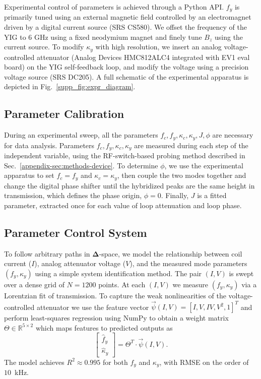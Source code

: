 \documentclass[%
  reprint,
  amsmath,amssymb,
  aps,
  prapplied,
  superscriptaddress,
  longbibliography]{revtex4-2}
\begin{document}
Experimental control of parameters is achieved through a Python API. $f_y$ is primarily tuned using an external magnetic field controlled by an electromagnet driven by a digital current source (SRS CS580). We offset the frequency of the YIG to 6 GHz using a fixed neodymium magnet and finely tune $B_z$ using the current source. To modify $\kappa_y$ with high resolution, we insert an analog voltage-controlled attenuator (Analog Devices HMC812ALC4 integrated with EV1 eval board) on the YIG self-feedback loop, and modify the voltage using a precision voltage source (SRS DC205). A full schematic of the experimental apparatus is depicted in Fig.~\ref{supp_fig:expr_diagram}.

\subsection{\label{appendix-sec:methods-calibration} Parameter Calibration}

During an experimental sweep, all the parameters $f_c, f_y, \kappa_c, \kappa_y, J, \phi$ are necessary for data analysis. Parameters $f_c, f_y, \kappa_c, \kappa_y$ are measured during each step of the independent variable, using the RF-switch-based probing method described in Sec.~\ref{appendix-sec:methods-device}. To determine $\phi$, we use the experimental apparatus to set $f_c = f_y$ and $\kappa_c = \kappa_y$, then couple the two modes together and change the digital phase shifter until the hybridized peaks are the same height in transmission, which defines the phase origin, $\phi = 0$. Finally, $J$ is a fitted parameter, extracted once for each value of loop attenuation and loop phase.

\subsection{\label{appendix-sec:methods-control} Parameter Control System}

To follow arbitrary paths in $\boldsymbol{\Delta}$-space, we model the relationship between coil current ($I$), analog attenuator voltage ($V$), and the measured mode parameters $(f_y, \kappa_y)$ using a simple system identification method. The pair $(I, V)$ is swept over a dense grid of $N = 1200$ points. At each $(I, V)$ we measure $(f_y, \kappa_y)$ via a Lorentzian fit of transmission. To capture the weak nonlinearities of the voltage-controlled attenuator we use the feature vector $\vec{\psi}(I, V) = [I, V, IV, V^2, 1]^T$ and perform least-squares regression using NumPy to obtain a weight matrix $\Theta \in \mathbb{R}^{5\times 2}$ which maps features to predicted outputs as
\begin{equation}
\begin{bmatrix}
\hat{f}_y \\
\hat{\kappa}_y
\end{bmatrix}  = \Theta^T \cdot \vec{\psi}(I,V).
\end{equation}
The model achieves $R^2 \approx 0.995$ for both $f_y$ and $\kappa_y$, with RMSE on the order of $10$~kHz.
\end{document}
